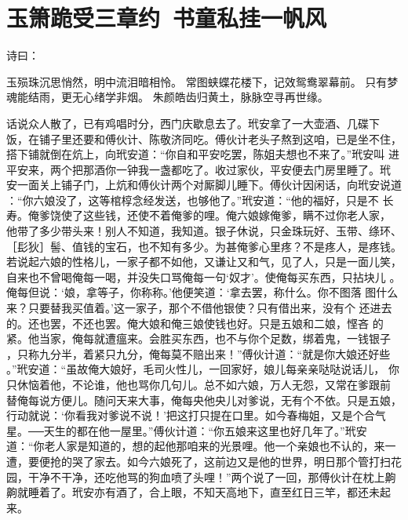 \chapter{玉箫跪受三章约~书童私挂一帆风}

诗曰：

玉殒珠沉思悄然，明中流泪暗相怜。
常图蛱蝶花楼下，记效鸳鸯翠幕前。
只有梦魂能结雨，更无心绪学非烟。
朱颜皓齿归黄土，脉脉空寻再世缘。

话说众人散了，已有鸡唱时分，西门庆歇息去了。玳安拿了一大壶酒、几碟下
饭，在铺子里还要和傅伙计、陈敬济同吃。傅伙计老头子熬到这咱，已是坐不住，
搭下铺就倒在炕上，向玳安道：“你自和平安吃罢，陈姐夫想也不来了。”玳安叫
进平安来，两个把那酒你一钟我一盏都吃了。收过家伙，平安便去门房里睡了。玳
安一面关上铺子门，上炕和傅伙计两个对厮脚儿睡下。傅伙计因闲话，向玳安说道
：“你六娘没了，这等棺椁念经发送，也够他了。”玳安道：“他的福好，只是不
长寿。俺爹饶使了这些钱，还使不着俺爹的哩。俺六娘嫁俺爹，瞒不过你老人家，
他带了多少带头来！别人不知道，我知道。银子休说，只金珠玩好、玉带、绦环、
［髟狄］髻、值钱的宝石，也不知有多少。为甚俺爹心里疼？不是疼人，是疼钱。
若说起六娘的性格儿，一家子都不如他，又谦让又和气，见了人，只是一面儿笑，
自来也不曾喝俺每一喝，并没失口骂俺每一句‘奴才’。使俺每买东西，只拈块儿
。俺每但说：‘娘，拿等子，你称称。’他便笑道：‘拿去罢，称什么。你不图落
图什么来？只要替我买值着。’这一家子，那个不借他银使？只有借出来，没有个
还进去的。还也罢，不还也罢。俺大娘和俺三娘使钱也好。只是五娘和二娘，悭吝
的紧。他当家，俺每就遭瘟来。会胜买东西，也不与你个足数，绑着鬼，一钱银子
，只称九分半，着紧只九分，俺每莫不赔出来！”傅伙计道：“就是你大娘还好些
。”玳安道：“虽故俺大娘好，毛司火性儿，一回家好，娘儿每亲亲哒哒说话儿，
你只休恼着他，不论谁，他也骂你几句儿。总不如六娘，万人无怨，又常在爹跟前
替俺每说方便儿。随问天来大事，俺每央他央儿对爹说，无有个不依。只是五娘，
行动就说：‘你看我对爹说不说！’把这打只提在口里。如今春梅姐，又是个合气
星。──天生的都在他一屋里。”傅伙计道：“你五娘来这里也好几年了。”玳安
道：“你老人家是知道的，想的起他那咱来的光景哩。他一个亲娘也不认的，来一
遭，要便抢的哭了家去。如今六娘死了，这前边又是他的世界，明日那个管打扫花
园，干净不干净，还吃他骂的狗血喷了头哩！”两个说了一回，那傅伙计在枕上齁
齁就睡着了。玳安亦有酒了，合上眼，不知天高地下，直至红日三竿，都还未起来。

